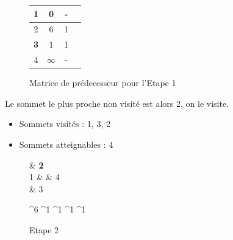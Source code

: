 \documentclass[a4paper,12pt,final] {article}
\begin{document}
\begin{figure}[H]
\begin{center}
\begin{tabular}{|c|c|c|c|}
\hline
 1 & 0 & - \\
\hline
2 & 6 & 1 \\
\hline
{\color{red} \bf 3} & 1 & 1 \\
\hline
4 & $\infty$ & - \\
\hline
\end{tabular}
\end{center}
\caption{Matrice de prédecesseur pour l'Etape 1}
\end{figure}
Le sommet le plus proche non visité est alors 2, on le visite.
\begin{itemize}
\item Sommets visités : 1, 3, 2
\item Sommets atteignables : 4
\end{itemize}
\begin{figure}[H]
 \centering
 \begin{psmatrix}[mnode=circle]
	    & {\color{red} \bf 2}\\
	1 &    & 4\\
	    &  3\\
\end{psmatrix}
	
	^{6}
	^{1}
	^{1}
	^{1}
	^{1}

  \caption{Etape 2}
\end{figure}
\end{document}
